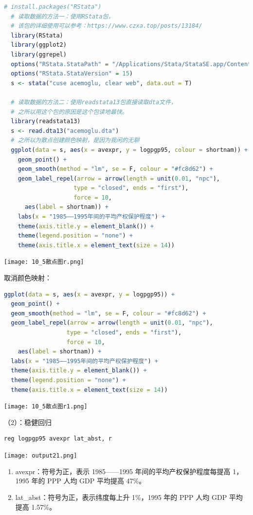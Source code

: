 \documentclass[cn,fancy,blue,11pt]{elegantbook}
\begin{document}
\begin{lstlisting}[language = R]
  # install.packages("RStata")
  # 读取数据的方法一：使用RStata包，
  # 该包的详细使用可以参考：https://www.czxa.top/posts/13184/
  library(RStata)
  library(ggplot2)
  library(ggrepel)
  options("RStata.StataPath" = "/Applications/Stata/StataSE.app/Contents/MacOS/stata-se")
  options("RStata.StataVersion" = 15)
  s <- stata("cuse acemoglu, clear web", data.out = T)

  # 读取数据的方法二：使用readstata13包直接读取dta文件，
  # 之所以用这个包的原因是这个包读地最快。
  library(readstata13)
  s <- read.dta13("acemoglu.dta")
  # 之所以为散点创建颜色映射，是因为我闲的无聊
  ggplot(data = s, aes(x = avexpr, y = logpgp95, colour = shortnam)) +
    geom_point() +
    geom_smooth(method = "lm", se = F, colour = "#fc8d62") +
    geom_label_repel(arrow = arrow(length = unit(0.01, "npc"),
                    type = "closed", ends = "first"),
                    force = 10,
      aes(label = shortnam)) +
    labs(x = "1985——1995年间的平均产权保护程度") +
    theme(axis.title.y = element_blank()) +
    theme(legend.position = "none") +
    theme(axis.title.x = element_text(size = 14))
\end{lstlisting}

\noindent\texttt{[image: 10\_5散点图r.png]}

取消颜色映射：

\begin{lstlisting}[language = R]
ggplot(data = s, aes(x = avexpr, y = logpgp95)) +
  geom_point() +
  geom_smooth(method = "lm", se = F, colour = "#fc8d62") +
  geom_label_repel(arrow = arrow(length = unit(0.01, "npc"),
                  type = "closed", ends = "first"),
                  force = 10,
    aes(label = shortnam)) +
  labs(x = "1985——1995年间的平均产权保护程度") +
  theme(axis.title.y = element_blank()) +
  theme(legend.position = "none") +
  theme(axis.title.x = element_text(size = 14))
\end{lstlisting}

\noindent\texttt{[image: 10\_5散点图r1.png]}

（2）：稳健回归

\begin{lstlisting}
reg logpgp95 avexpr lat_abst, r
\end{lstlisting}

\noindent\texttt{[image: output21.png]}

\begin{enumerate}
\item
  avexpr：符号为正，表示 1985------1995 年间的平均产权保护程度每提高 1，1995 年的 PPP 人均 GDP 平均提高 47\%。
\item
  lat\_abst：符号为正，表示纬度每上升 1\%，1995 年的 PPP 人均 GDP 平均提高 1.57\%。
\end{enumerate}
\end{document}
